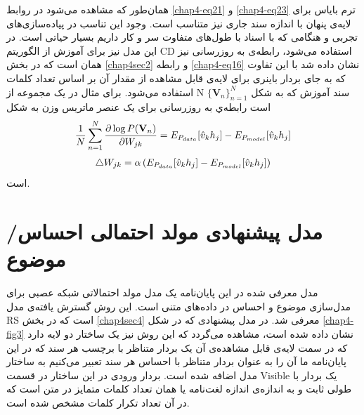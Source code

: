 همان‌طور که مشاهده می‌‌شود در روابط
\ref{chap4-eq21}
و
\ref{chap4-eq23}
ترم بایاس برای لایه‌ی پنهان با اندازه سند جاری نیز متناسب است. وجود این تناسب در پیاده‌سازی‌های تجربی‌ و هنگامی که با اسناد با طول‌های متفاوت سر و کار داریم بسیار حیاتی است. در این مدل نیز برای آموزش از الگوریتم
CD
استفاده می‌‌شود، رابطه‌ی به روزرسانی نیز همان است که در بخش
\ref{chap4sec2}
و رابطه
\ref{chap4-eq16}
نشان داده شد با این تفاوت که به جای بردار باینری برای لایه‌ی قابل مشاهده از مقدار آن بر اساس تعداد کلمات استفاده می‌‌شود. برای مثال در یک مجموعه از
N
سند آموزش که به شکل
$\{\textbf{V}_n\}_{n=1}^{N}$
است رابطه‌ي به روزرسانی برای یک عنصر ماتریس وزن به شکل
\begin{align}
	\centering
	\label{chap4-eq24}
	\dfrac{1}{N}\sum_{n=1}^{N}\dfrac{\partial\log P(\textbf{V}_n)}{\partial W_{jk}} = E_{P_{data}}[\hat{v}_kh_j]-E_{P_{model}}[\hat{v}_kh_j]
\end{align}
\begin{align}
	\centering
	\label{chap4-eq25}
	\triangle W_{jk} = \alpha \left( E_{P_{data}}[\hat{v}_kh_j]-E_{P_{model}}[\hat{v}_kh_j]  \right)
\end{align}
است.


\section{مدل پیشنهادی مولد احتمالی احساس/موضوع}
\label{chap4sec5}



مدل معرفی‌ شده در این پایان‌‌نامه یک مدل مولد احتمالاتی شبکه عصبی برای مدل‌سازی موضوع و احساس در داده‌های متنی است. این روش گسترش یافته‌ی مدل
RS
است که در بخش
\ref{chap4sec4}
معرفی شد. در مدل پیشنهادی که در شکل
\ref{chap4-fig3}
نشان داده شده است، مشاهده می‌‌گردد که این روش نیز یک ساختار دو لایه دارد که در سمت لایه‌ی قابل مشاهده‌ی آن یک بردار متناظر با برچسب هر سند که در این پایان‌‌نامه ما آن را به عنوان بردار متناظر با احساس هر سند تعبیر می‌کنیم به ساختار مدل اضافه شده است. بردار ورودی در این ساختار در قسمت
Visible
یک بردار با طولی ثابت و به اندازه‌ی اندازه لغت‌نامه یا همان تعداد کلمات متمایز در متن است که در آن تعداد تکرار کلمات مشخص شده است.

